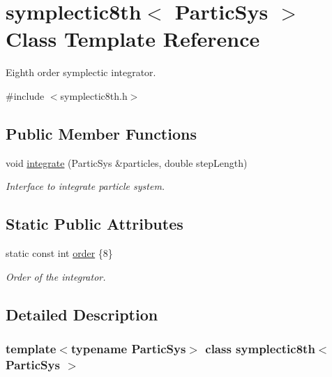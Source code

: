 \hypertarget{classsymplectic8th}{}\section{symplectic8th$<$ Partic\+Sys $>$ Class Template Reference}
\label{classsymplectic8th}


Eighth order symplectic integrator.  




{\ttfamily \#include $<$symplectic8th.\+h$>$}

\subsection*{Public Member Functions}
\begin{DoxyCompactItemize}
\item 
void \mbox{\hyperlink{classsymplectic8th_ab00fe2604c1471a27c2e6301c3820343}{integrate}} (Partic\+Sys \&particles, double step\+Length)
\begin{DoxyCompactList}\small\item\em Interface to integrate particle system. \end{DoxyCompactList}\end{DoxyCompactItemize}
\subsection*{Static Public Attributes}
\begin{DoxyCompactItemize}
\item 
static const int \mbox{\hyperlink{classsymplectic8th_a5f80ae81362e3542cb9ed7653f1b20d6}{order}} \{8\}
\begin{DoxyCompactList}\small\item\em Order of the integrator. \end{DoxyCompactList}\end{DoxyCompactItemize}


\subsection{Detailed Description}
\subsubsection*{template$<$typename Partic\+Sys$>$\newline
class symplectic8th$<$ Partic\+Sys $>$}

